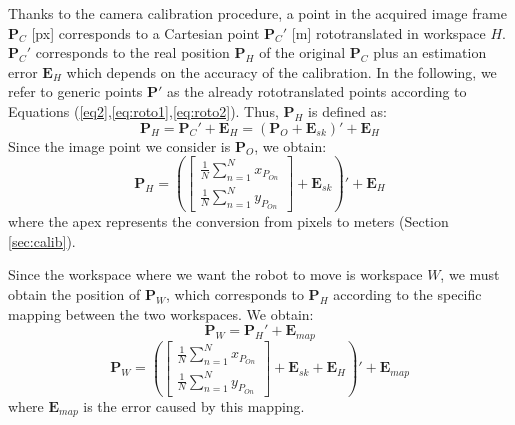 \documentclass[letterpaper, 10 pt, conference]{ieeeconf}  %
\begin{document}
Thanks to the camera calibration procedure, a point in the acquired image frame $\mathbf{P}_C$ [px] corresponds to a Cartesian point $\mathbf{P}_C'$ [m] rototranslated in workspace  $H$. $\mathbf{P}_C'$ corresponds to the real position $\mathbf{P}_H$ of the original $\mathbf{P}_C$ plus an estimation error $\mathbf{E}_H$ which depends on the accuracy of the calibration. In the following, we refer to generic points $\mathbf{P}'$ as the already rototranslated points according to Equations (\ref{eq2},\ref{eq:roto1},\ref{eq:roto2}). Thus, $\mathbf{P}_H$ is defined as:
\begin{equation}
\mathbf{P}_H = \mathbf{P}_C' + \mathbf{E}_H = (\mathbf{P}_O + \mathbf{E}_{sk})' + \mathbf{E}_H
\end{equation}
Since the image point we consider is $\mathbf{P}_O$, we obtain: 
\begin{equation}
\mathbf{P}_H = \left(\begin{bmatrix}
\frac{1}{N}\sum_{n=1}^{N}x_{P_{On}} \\
\frac{1}{N}\sum_{n=1}^{N}y_{P_{On}}
\end{bmatrix} + \mathbf{E}_{sk} \right)' + \mathbf{E}_H
\end{equation}
where the apex represents the conversion from pixels to meters (Section \ref{sec:calib}).

Since the workspace where we want the robot to move is workspace $W$, we must obtain the position of $\mathbf{P}_W$, which corresponds to $\mathbf{P}_H$ according to the specific mapping between the two workspaces. We obtain:
\begin{equation}
\mathbf{P}_W = \mathbf{P}_H' + \mathbf{E}_{map}
\end{equation}
\begin{equation}
\mathbf{P}_W = \left(\begin{bmatrix}
\frac{1}{N}\sum_{n=1}^{N}x_{P_{On}} \\
\frac{1}{N}\sum_{n=1}^{N}y_{P_{On}}
\end{bmatrix} + \mathbf{E}_{sk} + \mathbf{E}_{H}\right)' + \mathbf{E}_{map}
\end{equation}
where $\mathbf{E}_{map}$ is the error caused by this mapping.
\end{document}
